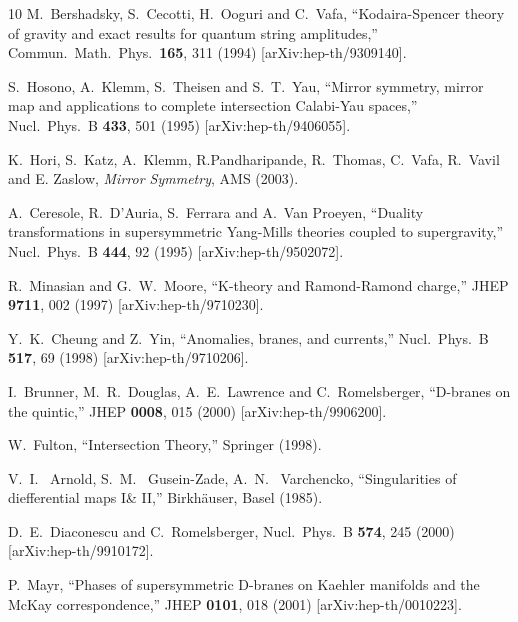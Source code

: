 \documentclass[12pt]{article}
\begin{document}
\begin{thebibliography}{10}
  M.~Bershadsky, S.~Cecotti, H.~Ooguri and C.~Vafa,
   ``Kodaira-Spencer theory of gravity and exact results for quantum string
  amplitudes,''
  Commun.\ Math.\ Phys.\  {\bf 165}, 311 (1994)
  [arXiv:hep-th/9309140].

  S.~Hosono, A.~Klemm, S.~Theisen and S.~T.~Yau,
   ``Mirror symmetry, mirror map and applications to complete intersection
  Calabi-Yau spaces,''
  Nucl.\ Phys.\ B {\bf 433}, 501 (1995)
  [arXiv:hep-th/9406055].

 K.~Hori, S.~Katz, A.~Klemm, R.Pandharipande, R.~Thomas, C.~Vafa, R.~Vavil and E. Zaslow,
{\sl Mirror Symmetry}, AMS (2003).

  A.~Ceresole, R.~D'Auria, S.~Ferrara and A.~Van Proeyen,
   ``Duality transformations in supersymmetric Yang-Mills theories coupled to
   supergravity,''
  Nucl.\ Phys.\ B {\bf 444}, 92 (1995)
  [arXiv:hep-th/9502072].

  R.~Minasian and G.~W.~Moore,
   ``K-theory and Ramond-Ramond charge,''
  JHEP {\bf 9711}, 002 (1997)
  [arXiv:hep-th/9710230].

  Y.~K.~Cheung and Z.~Yin,
   ``Anomalies, branes, and currents,''
  Nucl.\ Phys.\ B {\bf 517}, 69 (1998)
  [arXiv:hep-th/9710206].

  I.~Brunner, M.~R.~Douglas, A.~E.~Lawrence and C.~Romelsberger,
   ``D-branes on the quintic,''
  JHEP {\bf 0008}, 015 (2000)
  [arXiv:hep-th/9906200].


 W.~Fulton, ``Intersection Theory,'' Springer (1998).

 V.~I.~ Arnold, S.~M.~ Gusein-Zade, A.~N.~ Varchencko, ``Singularities of diefferential maps I\& II,''
Birkh\"auser, Basel (1985).


  D.~E.~Diaconescu and C.~Romelsberger,
  Nucl.\ Phys.\ B {\bf 574}, 245 (2000)
  [arXiv:hep-th/9910172].

  P.~Mayr,
   ``Phases of supersymmetric D-branes on Kaehler manifolds and the McKay
   correspondence,''
  JHEP {\bf 0101}, 018 (2001)
  [arXiv:hep-th/0010223].


\end{thebibliography}
\end{document}
